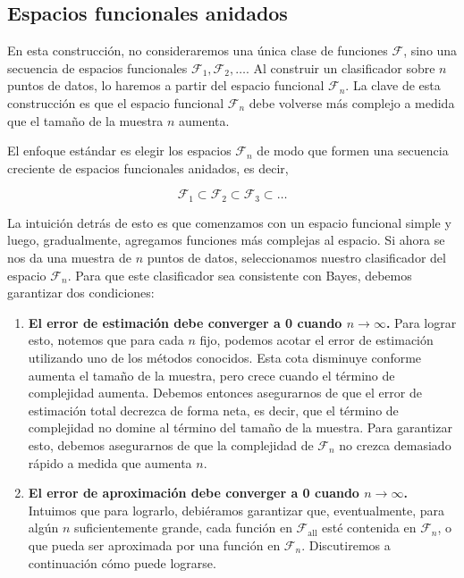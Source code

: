 \documentclass{article}
\begin{document}
\subsection{Espacios funcionales anidados}

En esta construcción, no consideraremos una única clase de funciones \(\mathcal{F}\), sino una 
secuencia de espacios funcionales \(\mathcal{F}_1, \mathcal{F}_2, \dots\). Al construir un 
clasificador sobre \(n\) puntos de datos, lo haremos a partir del espacio funcional \(\mathcal{F}_n\). 
La clave de esta construcción es que el espacio funcional \(\mathcal{F}_n\) debe volverse más 
complejo a medida que el tamaño de la muestra \(n\) aumenta.\newline

El enfoque estándar es elegir los espacios \(\mathcal{F}_n\) de modo que formen una secuencia 
creciente de espacios funcionales anidados, es decir,

\[
\mathcal{F}_1 \subset \mathcal{F}_2 \subset \mathcal{F}_3 \subset \dots
\]

La intuición detrás de esto es que comenzamos con un espacio funcional simple y luego, 
gradualmente, agregamos funciones más complejas al espacio. Si ahora se nos da una muestra 
de \(n\) puntos de datos, seleccionamos nuestro clasificador del espacio \(\mathcal{F}_n\). 
Para que este clasificador sea consistente con Bayes, debemos garantizar dos condiciones:\newline

\begin{enumerate}
    \item \textbf{El error de estimación debe converger a 0 cuando \(n \to \infty\).} Para lograr esto, 
    notemos que para cada \(n\) fijo, podemos acotar el error de estimación utilizando uno de los 
    métodos conocidos. Esta cota disminuye conforme aumenta el tamaño de la muestra, pero 
    crece cuando el término de complejidad aumenta. Debemos entonces asegurarnos de que el error de 
    estimación total decrezca de forma neta, es decir, que el término de complejidad no domine al término 
    del tamaño de la muestra. Para garantizar esto, debemos asegurarnos de que la complejidad de 
    \(\mathcal{F}_n\) no crezca demasiado rápido a medida que aumenta \(n\).

    \item \textbf{El error de aproximación debe converger a 0 cuando \(n \to \infty\).} Intuimos que 
    para lograrlo, 
    debiéramos garantizar que, eventualmente, para algún \(n\) suficientemente grande, cada función en 
    \(\mathcal{F}_{\text{all}}\) esté contenida en \(\mathcal{F}_n\), o que pueda ser aproximada por 
    una función en \(\mathcal{F}_n\). Discutiremos a continuación cómo puede lograrse.
\end{enumerate}
\end{document}
